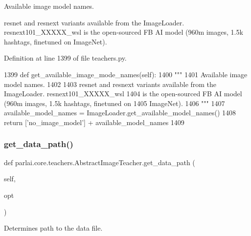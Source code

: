 \begin{DoxyVerb}Available image model names.

resnet and resnext variants available from the ImageLoader. resnext101_XXXXX_wsl
is the open-sourced FB AI model (960m images, 1.5k hashtags, finetuned on
ImageNet).
\end{DoxyVerb}
 

Definition at line 1399 of file teachers.\+py.


\begin{DoxyCode}
1399     \textcolor{keyword}{def }get\_available\_image\_mode\_names(self):
1400         \textcolor{stringliteral}{"""}
1401 \textcolor{stringliteral}{        Available image model names.}
1402 \textcolor{stringliteral}{}
1403 \textcolor{stringliteral}{        resnet and resnext variants available from the ImageLoader. resnext101\_XXXXX\_wsl}
1404 \textcolor{stringliteral}{        is the open-sourced FB AI model (960m images, 1.5k hashtags, finetuned on}
1405 \textcolor{stringliteral}{        ImageNet).}
1406 \textcolor{stringliteral}{        """}
1407         available\_model\_names = ImageLoader.get\_available\_model\_names()
1408         \textcolor{keywordflow}{return} [\textcolor{stringliteral}{'no\_image\_model'}] + available\_model\_names
1409 
\end{DoxyCode}
\mbox{\label{classparlai_1_1core_1_1teachers_1_1AbstractImageTeacher_aa3c1da773025838ffa03b47c3fc21c7e}} 
\subsubsection{\texorpdfstring{get\+\_\+data\+\_\+path()}{get\_data\_path()}}
{\footnotesize\ttfamily def parlai.\+core.\+teachers.\+Abstract\+Image\+Teacher.\+get\+\_\+data\+\_\+path (\begin{DoxyParamCaption}\item[{}]{self,  }\item[{}]{opt }\end{DoxyParamCaption})}

\begin{DoxyVerb}Determines path to the data file.
\end{DoxyVerb}
 

